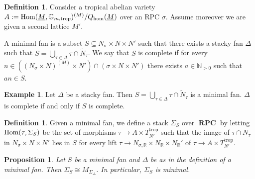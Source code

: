 \documentclass[11pt]{amsart}
\newtheorem{proposition}[theorem]{Proposition}
\theoremstyle{definition}
\newtheorem{definition}[theorem]{Definition}
\newtheorem{example}[theorem]{Example}
\theoremstyle{remark}
\def\hom{\mathrm{hom}}
\def\trop{\mathrm{trop}}
\DeclareMathOperator{\RPC}{\mathbf{RPC}}
\DeclareMathOperator{\Hom}{\textup{Hom}}
\begin{document}
\begin{definition}
	\label{def:minimal_fan}
	Consider a tropical abelian variety $A:=\Hom(\underline{M},\mathbb{G}_{m,\trop})^{(M)}/Q_{\hom}(\underline{M})$
	over an RPC $\sigma$. Assume moreover we are given a second lattice $M'$.

	A minimal fan is a subset $S\subseteq N_{\sigma}\times N\times N'$
	such that there exists a stacky fan $\Delta$ such that $S=\bigcup_{\tau\in \Delta}\tau\cap \tilde{N}_{\tau}$.
	We say that $S$ is complete if for every $n\in ((N_{\sigma}\times N)^{(M)}\times N')\cap (\sigma\times N \times N')$ there exists $a\in \mathbb{N}_{>0}$
	such that $an\in S$.
\end{definition}

\begin{example}
	Let $\Delta$ be a stacky fan. Then $S=\bigcup_{\tau\in \Delta}\tau\cap \tilde{N}_{\tau}$
	is a minimal fan. $\Delta$ is complete if and only if $S$ is complete.
\end{example}

\begin{definition}
	Given a minimal fan, we define a stack $\Sigma_{S}$ over $\RPC$ by letting $\Hom(\tau,\Sigma_{S})$ be the
	set of morphisms $\tau\to A\times T_{N'}^{\trop}$ such that the image of $\tau\cap N_{\tau}$ in $N_{\sigma}\times N\times N'$
	lies in $S$ for every lift $\tau\to N_{\sigma,\mathbb{R}}\times N_{\mathbb{R}}\times N_{\mathbb{R}}'$
	of $\tau\to A\times T_{N'}^{\trop}$.
\end{definition}

\begin{proposition}
	Let $S$ be a minimal fan and $\Delta$ be as in the definition of a minimal fan. Then
	$\Sigma_S\cong M_{\Sigma_{\Delta}}$. In particular, $\Sigma_S$ is minimal.
\end{proposition}
\end{document}
